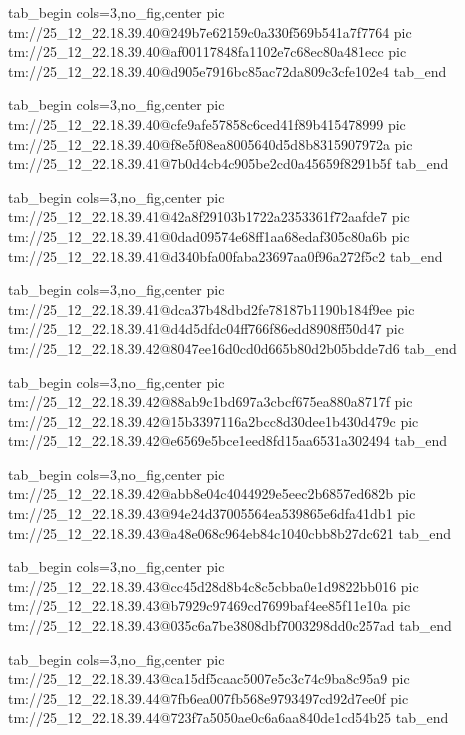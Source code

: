  
 
 
 
 

\qqSecCmtScr


\ifcmt
  tab_begin cols=3,no_fig,center
    pic tm://25_12_22.18.39.40@249b7e62159c0a330f569b541a7f7764
    pic tm://25_12_22.18.39.40@af00117848fa1102e7c68ec80a481ecc
    pic tm://25_12_22.18.39.40@d905e7916bc85ac72da809c3cfe102e4
  tab_end
\fi


\ifcmt
  tab_begin cols=3,no_fig,center
    pic tm://25_12_22.18.39.40@cfe9afe57858c6ced41f89b415478999
    pic tm://25_12_22.18.39.40@f8e5f08ea8005640d5d8b8315907972a
    pic tm://25_12_22.18.39.41@7b0d4cb4c905be2cd0a45659f8291b5f
  tab_end
\fi


\ifcmt
  tab_begin cols=3,no_fig,center
    pic tm://25_12_22.18.39.41@42a8f29103b1722a2353361f72aafde7
    pic tm://25_12_22.18.39.41@0dad09574e68ff1aa68edaf305c80a6b
    pic tm://25_12_22.18.39.41@d340bfa00faba23697aa0f96a272f5c2
  tab_end
\fi


\ifcmt
  tab_begin cols=3,no_fig,center
    pic tm://25_12_22.18.39.41@dca37b48dbd2fe78187b1190b184f9ee
    pic tm://25_12_22.18.39.41@d4d5dfdc04ff766f86edd8908ff50d47
    pic tm://25_12_22.18.39.42@8047ee16d0cd0d665b80d2b05bdde7d6
  tab_end
\fi


\ifcmt
  tab_begin cols=3,no_fig,center
    pic tm://25_12_22.18.39.42@88ab9c1bd697a3cbcf675ea880a8717f
    pic tm://25_12_22.18.39.42@15b3397116a2bcc8d30dee1b430d479c
    pic tm://25_12_22.18.39.42@e6569e5bce1eed8fd15aa6531a302494
  tab_end
\fi


\ifcmt
  tab_begin cols=3,no_fig,center
    pic tm://25_12_22.18.39.42@abb8e04c4044929e5eec2b6857ed682b
    pic tm://25_12_22.18.39.43@94e24d37005564ea539865e6dfa41db1
    pic tm://25_12_22.18.39.43@a48e068c964eb84c1040cbb8b27dc621
  tab_end
\fi


\ifcmt
  tab_begin cols=3,no_fig,center
    pic tm://25_12_22.18.39.43@cc45d28d8b4c8c5cbba0e1d9822bb016
    pic tm://25_12_22.18.39.43@b7929c97469cd7699baf4ee85f11e10a
    pic tm://25_12_22.18.39.43@035c6a7be3808dbf7003298dd0c257ad
  tab_end
\fi


\ifcmt
  tab_begin cols=3,no_fig,center
    pic tm://25_12_22.18.39.43@ca15df5caac5007e5c3c74c9ba8c95a9
    pic tm://25_12_22.18.39.44@7fb6ea007fb568e9793497cd92d7ee0f
    pic tm://25_12_22.18.39.44@723f7a5050ae0c6a6aa840de1cd54b25
  tab_end
\fi



